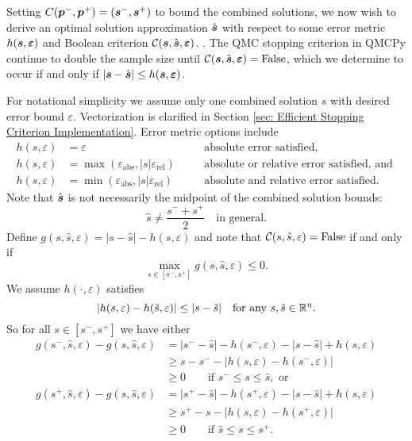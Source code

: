 \documentclass{article}
\newcommand{\varepsabs}{\varepsilon_\text{abs}}
\newcommand{\varepsrel}{\varepsilon_\text{rel}}
\begin{document}
Setting $C(\boldsymbol{p}^-,\boldsymbol{p}^+) = (\boldsymbol{s}^-,\boldsymbol{s}^+)$ to bound the combined solutions, we now wish to derive an optimal solution approximation $\hat{\boldsymbol{s}}$ with respect to some error metric $h(\boldsymbol{s},\boldsymbol{\varepsilon})$ and Boolean criterion $\mathcal{C}(\boldsymbol{s},\hat{\boldsymbol{s}},\boldsymbol{\varepsilon})$.  . The QMC stopping criterion in QMCPy continue to double the sample size until $\mathcal{C}(\boldsymbol{s},\hat{\boldsymbol{s}},\boldsymbol{\varepsilon})=\text{False}$, which we determine to occur if and only if $\lvert \boldsymbol{s} - \hat{\boldsymbol{s}} \rvert \leq h(\boldsymbol{s},\boldsymbol{\varepsilon})$. 

For notational simplicity we assume only one combined solution $s$ with desired error bound $\varepsilon$. Vectorization is clarified in Section \ref{sec: Efficient Stopping Criterion Implementation}. Error metric options include
\begin{subequations}
\begin{align}
    h(s,\varepsilon) & = \varepsilon \quad &&\text{absolute error satisfied}, \\
    h(s,\varepsilon) &= \max\left(\varepsabs,\lvert s \rvert \varepsrel \right) \quad &&\text{absolute or relative error satisfied, and } \label{eq:h_abs_or_rel} \\
    h(s,\varepsilon) &= \min\left(\varepsabs,\lvert s \rvert \varepsrel \right) \quad &&\text{absolute and relative error satisfied.} \label{eq:h_abs_and_rel}
\end{align}
\end{subequations}
Note that $\hat{\boldsymbol{s}}$ is not necessarily the midpoint of the combined solution bounds:
\begin{equation}
    \hat{s} \neq \frac{s^-+s^+}{2} \quad \text{in general.}
\end{equation}
Define $g(s,\hat{s},\varepsilon)=\lvert s - \hat{s} \rvert -h(s,\varepsilon)$ and note that $\mathcal{C}(s,\hat{s},\varepsilon)=\text{False}$ if and only if 
\begin{equation}
    \max_{s \in [s^-,s^+]} g(s,\hat{s},\varepsilon) \leq 0.
\end{equation}
We assume $h(\cdot,\varepsilon)$ satisfies 
\begin{equation}
    \lvert h(s,\varepsilon) - h(\tilde{s},\varepsilon) \rvert \leq \lvert s - \tilde{s} \rvert \quad \text{for any } s,\tilde{s} \in \mathbb{R}^\eta.
\end{equation}
So for all $s \in [s^-,s^+]$ we have either
\begin{align}
    g(s^-,\hat{s},\varepsilon)-g(s,\hat{s},\varepsilon) 
    &= \lvert s^- - \hat{s} \rvert -h(s^-,\varepsilon) - \lvert s - \hat{s} \rvert  + h(s,\varepsilon) \\
    &\geq s - s^- - \lvert h(s,\varepsilon)-h(s^-,\varepsilon) \rvert \\
    &\geq 0 \qquad \text{if } s^- \leq s \leq \hat{s}, \text{ or} \\
    g(s^+,\hat{s},\varepsilon)-g(s,\hat{s},\varepsilon) 
    &= \lvert s^+ - \hat{s} \rvert -h(s^+,\varepsilon) - \lvert s - \hat{s} \rvert  + h(s,\varepsilon) \\
    &\geq s^+ - s - \lvert h(s,\varepsilon)-h(s^+,\varepsilon) \rvert \\
    &\geq 0 \qquad \text{if } \hat{s} \leq s \leq s^+.
\end{align}
\end{document}
